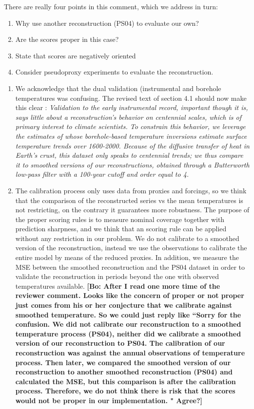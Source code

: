 \documentclass[11pt]{article}
\newcommand{\bl}[1]{\color{red}\textbf{[Bo: #1]}\normalcolor}
\begin{document}
\begin{itemize}
There are really four points in this comment, which we address in turn:
\begin{enumerate}
\item Why use another reconstruction (PS04) to evaluate our own? 
\item Are the scores proper in this case? 
\item State that scores are negatively oriented
\item Consider pseudoproxy experiments to evaluate the reconstruction. 
\end{enumerate}
\begin{enumerate}
    \item  We acknowledge that the dual validation (instrumental and borehole temperatures was confusing. The revised text of section 4.1 should now make this clear : {\it Validation to the early instrumental record, important though it is, says little about a reconstruction's behavior on centennial scales, which is of primary interest to climate scientists. To constrain this behavior, we leverage the estimates of \citet[hereafter, PS04]{Pollack2004} whose borehole-based
temperature inversions estimate surface temperature trends over 1600-2000. Because of the diffusive transfer of heat in Earth's crust, this dataset only speaks to centennial trends; we thus compare it to smoothed versions of our reconstructions, obtained through a Butterworth low-pass filter with a 100-year cutoff and order equal to 4.} 
\item  The
calibration process only uses data from proxies and forcings, so we think that
the comparison of the reconstructed series vs the mean temperatures is not
restricting, on the contrary it guarantees more robustness. The purpose of the
proper scoring rules is to measure nominal coverage together with prediction
sharpness, and we think that an scoring rule can be applied without any
restriction in our problem. We do not calibrate to a smoothed version of the
reconstruction, instead we use the observations to calibrate the entire model by
means of the reduced proxies. In addition, we measure the MSE between the smoothed reconstruction
and the PS04 dataset in order to validate the reconstruction in periods beyond
the one with observed temperatures available. \bl{After I read one more time of the reviewer comment. Looks like the concern of proper or not proper just comes from his or her conjecture that we calibrate against smoothed temperature. So we could just reply like ``Sorry for the confusion. We did not calibrate our reconstruction to a smoothed temperature process (PS04), neither did we calibrate a smoothed version of our reconstruction to PS04. The calibration of our reconstruction was against the annual observations of temperature process. Then later, we compared the smoothed version of our reconstruction to another smoothed reconstruction (PS04) and calculated the MSE, but this comparison is after the calibration process. Therefore, we do not think there is risk that the scores would not be proper in our implementation. " Agree?}


\end{enumerate}
\end{itemize}
\end{document}
